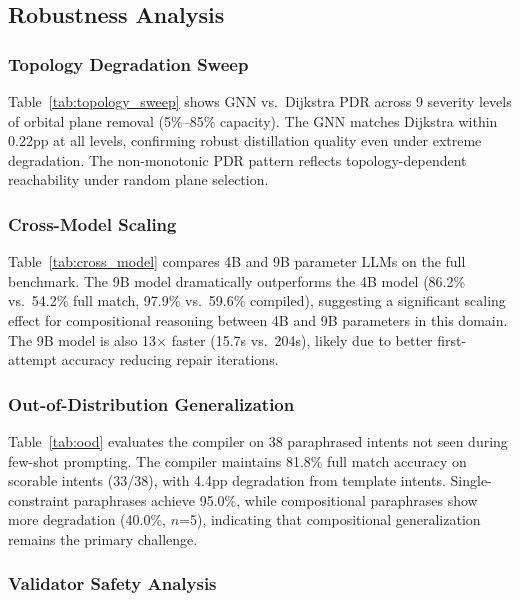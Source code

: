 \documentclass[10pt, conference, letterpaper]{IEEEtran}
\begin{document}
\subsection{Robustness Analysis}
\label{sec:robustness}

\subsubsection{Topology Degradation Sweep}

Table~\ref{tab:topology_sweep} shows GNN vs.\ Dijkstra PDR across
9 severity levels of orbital plane removal (5\%--85\% capacity).
The GNN matches Dijkstra within 0.22pp at all levels, confirming
robust distillation quality even under extreme degradation. The
non-monotonic PDR pattern reflects topology-dependent reachability
under random plane selection.

\subsubsection{Cross-Model Scaling}

Table~\ref{tab:cross_model} compares 4B and 9B parameter LLMs on
the full benchmark. The 9B model dramatically outperforms the 4B
model (86.2\% vs.\ 54.2\% full match, 97.9\% vs.\ 59.6\% compiled),
suggesting a significant scaling effect for compositional reasoning
between 4B and 9B parameters in this domain. The 9B model is also 13$\times$ faster
(15.7s vs.\ 204s), likely due to better first-attempt accuracy
reducing repair iterations.

\subsubsection{Out-of-Distribution Generalization}

Table~\ref{tab:ood} evaluates the compiler on 38 paraphrased intents
not seen during few-shot prompting. The compiler maintains 81.8\%
full match accuracy on scorable intents (33/38), with 4.4pp
degradation from template intents. Single-constraint paraphrases
achieve 95.0\%, while compositional paraphrases show more degradation
(40.0\%, $n$=5), indicating that compositional generalization remains
the primary challenge.

\subsubsection{Validator Safety Analysis}
\end{document}

